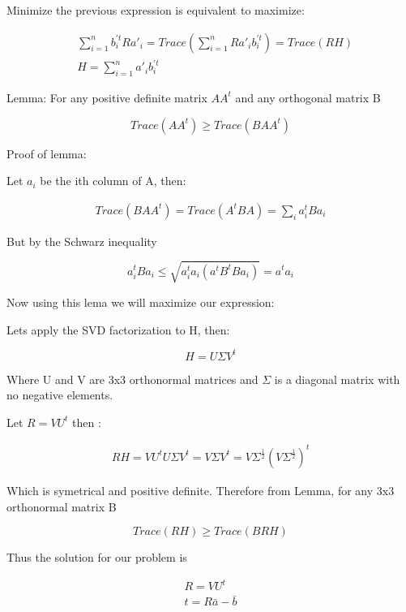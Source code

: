 Minimize the previous expression is equivalent to maximize:

\begin{align*}
& \sum\limits_{i=1}^n b_i^{\prime t} R a'_i =  Trace ( \sum\limits_{i=1}^n R a'_i  b_i^{\prime t} ) = Trace (RH) \\
& H=\sum\limits_{i=1}^n a'_i  b_i^{\prime t} 
\end{align*}

Lemma: For any positive definite matrix $A A^t$ and any orthogonal matrix B 

\[ Trace( A A^t ) \geq Trace (B A A^t) \]

Proof of lemma:

Let $a_i$ be the ith column of A, then:

\begin{align*}
Trace( B A A^t ) = Trace (A^t B A) = \sum\limits_i a_i^t B a_i 
\end{align*}

But by the Schwarz inequality

\[ a_i^t B a_i \leq \sqrt{ a_i^t a_i (a^t B^t B a_i)} = a^t a_i \]


Now using this lema we will maximize our expression:


Lets apply the SVD factorization to H, then:

\[ H = U \Sigma V^t \]

Where U and V are 3x3 orthonormal matrices and $\Sigma$ is a diagonal matrix with no negative elements.

Let $ R = V U^t $ then :

\begin{align*}
RH = VU^t U \Sigma V^t = V \Sigma V^t = V \Sigma^{\frac{1}{2}} (V \Sigma^{\frac{1}{2}})^t
\end{align*}

Which is symetrical and positive definite.
Therefore from Lemma, for any 3x3 orthonormal matrix B

\[ Trace( R H ) \geq Trace( B R H ) \]

Thus the solution for our problem is 

\begin{align*}
R = V U^t \\
t = R \bar{a} - \bar{b}
\end{align*}
